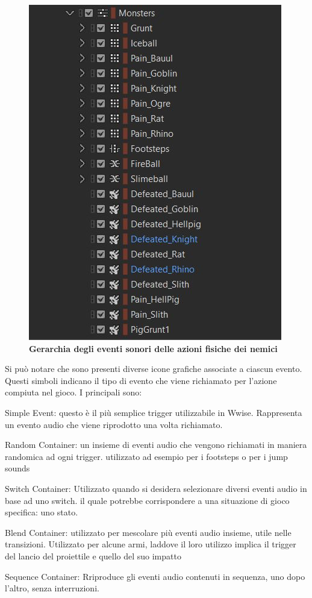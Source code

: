 	\begin{figure}[h]
		\begin{center}
			\includegraphics[width=.47\textwidth]{img/image6.jpg}
			\caption{\textbf{Gerarchia degli eventi sonori delle azioni fisiche dei nemici}}
				\label{gr01}
		\end{center}
	\end{figure}
	
	Si può notare che sono presenti diverse icone grafiche associate a ciascun evento. Questi simboli indicano il tipo di evento che viene richiamato per l'azione compiuta nel gioco. I principali sono:
	
	\begin{compactitem}
		\item Simple Event: questo è il più semplice trigger utilizzabile in Wwise. Rappresenta un evento audio che viene riprodotto una volta richiamato.
		\item Random Container: un insieme di eventi audio che vengono richiamati in maniera randomica ad ogni trigger. utilizzato ad esempio per i footsteps o per i jump sounds
		\item Switch Container: Utilizzato quando si desidera selezionare diversi eventi audio in base ad uno switch. il quale potrebbe corrispondere a una situazione di gioco specifica: uno stato.
		\item Blend Container: utilizzato per mescolare più eventi audio insieme, utile nelle transizioni. Utilizzato per alcune armi, laddove il loro utilizzo implica il trigger del lancio del proiettile e quello del suo impatto
		\item Sequence Container: Rriproduce gli eventi audio contenuti in sequenza, uno dopo l'altro, senza interruzioni.
	\end{compactitem}
	
